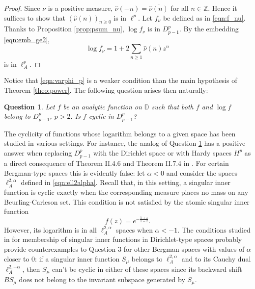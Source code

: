 \documentclass{birkjour}
\numberwithin{equation}{section}
\theoremstyle{plain}
\newtheorem{question}{Question}
\theoremstyle{definition}
\newcommand{\D}{\mathbb{D}}
\newcommand{\Z}{\mathbb{Z}}
\newcommand{\1}{\mathds{1}}
\begin{document}
\begin{proof}
Since $\nu$ is a positive measure, $\hat\nu(-n)=\overline{\hat\nu(n)}$ for all $n\in\Z$. Hence it suffices to show that $(\hat\nu(n))_{n\ge0}$ is in $\ell^p$. Let $f_\nu$ be defined as in \eqref{eqn:f_nu}. Thanks to Proposition \ref{prop:psum_nu}, $\log f_\nu$ is in $D^p_{p-1}$. By the embedding \eqref{eqn:emb_ge2}, 
\begin{equation}
\label{eqn:log_ellp}
\log f_\nu=1+2\sum_{n\ge1}\hat\nu(n)z^n
\end{equation}
is in $\ell^p_A$. 
\end{proof}

Notice that \eqref{eqn:varphi_p} is a weaker condition than the main hypothesis of Theorem \ref{theo:power}. The following question arises then naturally:

\begin{question}
\label{q:Besov}
    Let $f$ be an analytic function on $\D$ such that both $f$ and $\log f$ belong to $D^p_{p-1}$, $p>2$. Is $f$ cyclic in $D^p_{p-1}$?
\end{question}

The cyclicity of functions whose logarithm belongs to a given space has been studied in  various settings. For instance, the analog of Question \ref{q:Besov} has a positive answer when replacing $D^p_{p-1}$ with the Dirichlet space \cite{BCL+15, Aleman} or with Hardy spaces $H^p$ as a direct consequence of Theorem II.4.6 and Theorem II.7.4 in \cite{garnett}. For certain Bergman-type spaces this is evidently false: let $\alpha <0$ and consider the spaces $\ell^{2, \alpha}_A$ defined in \eqref{eqn:ell2alpha}. Recall that, in this setting, a singular inner function is cyclic exactly when the corresponding measure places no mass on any Beurling-Carleson set. This condition is not satisfied by the atomic singular inner function \[f(z) = e^{-\frac{1+z}{1-z}}.\] However, its logarithm is in all $\ell^{2,\alpha}_A$ spaces when $\alpha <-1$. The conditions studied in \cite{ivriinicolau} for membership of singular inner functions in Dirichlet-type spaces probably provide counterexamples to Question 3 for other Bergman spaces with values of $\alpha$ closer to 0: if a singular inner function $S_\mu$ belongs to $\ell^{2,\alpha}_A$ and to its Cauchy dual $\ell^{2,-\alpha}_A$, then $S_\mu$ can't be cyclic in either of these spaces since its backward shift $BS_\mu$ does not belong to the invariant subspace generated by $S_\mu$. 
\end{document}
